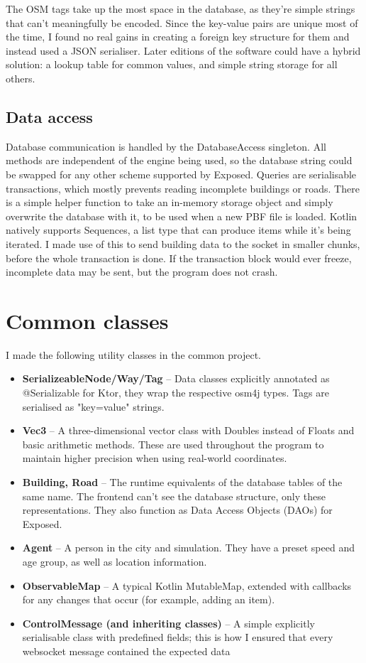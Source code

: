 The OSM tags take up the most space in the database, as they're simple strings that can't meaningfully be encoded. Since the key-value pairs are unique most of the time, I found no real gains in creating a foreign key structure for them and instead used a JSON serialiser. Later editions of the software could have a hybrid solution: a lookup table for common values, and simple string storage for all others.



\subsection{Data access}

Database communication is handled by the DatabaseAccess singleton. All methods are independent of the engine being used, so the database string could be swapped for any other scheme supported by Exposed. Queries are serialisable transactions, which mostly prevents reading incomplete buildings or roads. There is a simple helper function to take an in-memory storage object and simply overwrite the database with it, to be used when a new PBF file is loaded. Kotlin natively supports Sequences, a list type that can produce items while it's being iterated. I made use of this to send building data to the socket in smaller chunks, before the whole transaction is done. If the transaction block would ever freeze, incomplete data may be sent, but the program does not crash.


\section{Common classes}

I made the following utility classes in the common project. \begin{itemize}
    \item \textbf{SerializeableNode/Way/Tag} -- Data classes explicitly annotated as @Serializable for Ktor, they wrap the respective osm4j types. Tags are serialised as "key=value" strings.
    \item \textbf{Vec3} -- A three-dimensional vector class with Doubles instead of Floats and basic arithmetic methods. These are used throughout the program to maintain higher precision when using real-world coordinates.
    \item \textbf{Building, Road} -- The runtime equivalents of the database tables of the same name. The frontend can't see the database structure, only these representations. They also function as Data Access Objects (DAOs) for Exposed.
    \item \textbf{Agent} -- A person in the city and simulation. They have a preset speed and age group, as well as location information.
    \item \textbf{ObservableMap} -- A typical Kotlin MutableMap, extended with callbacks for any changes that occur (for example, adding an item).
    \item \textbf{ControlMessage (and inheriting classes)} -- A simple explicitly serialisable class with predefined fields; this is how I ensured that every websocket message contained the expected data
\end{itemize}

